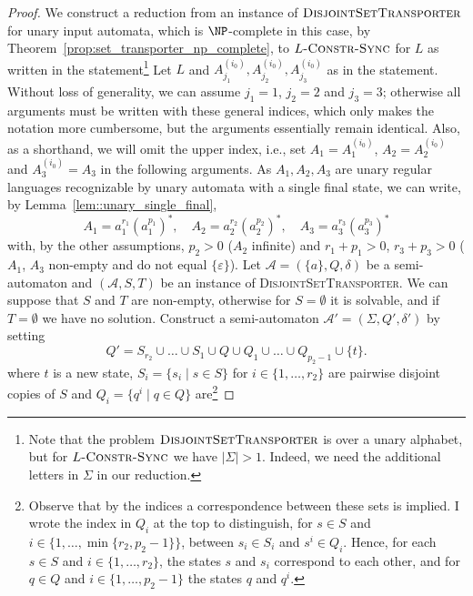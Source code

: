 \begin{proof}
 We construct a reduction from an instance
 of $\textsc{DisjointSetTransporter}$
 for unary input automata, which is $\NP$-complete in
 this case, by Theorem~\ref{prop:set_transporter_np_complete},
 to $L\textsc{-Constr-Sync}$ for $L$ as written in the statement\footnote{Note that the problem $\textsc{DisjointSetTransporter}$ is over a unary alphabet, but for $L\textsc{-Constr-Sync}$
 we have $|\Sigma| > 1$. Indeed, we need the additional letters in $\Sigma$ in our reduction.}
Let $L$ and $A_{j_1}^{(i_0)}, A_{j_2}^{(i_0)}, A_{j_3}^{(i_0)}$
as in the statement. 
Without loss of generality, we can assume $j_1 = 1$, $j_2 = 2$
and $j_3 = 3$; otherwise all arguments must be written with these general indices, which
only makes the notation more cumbersome, but the arguments essentially remain identical.
Also, as a shorthand,
we will omit the upper index, i.e.,
set $A_1 = A_1^{(i_0)}$, $A_2 = A_2^{(i_0)}$ and $A_3^{(i_0)} = A_3$
in the following arguments.
As $A_1, A_2, A_3$ are unary regular languages recognizable by 
unary automata with a single final state, we can write, by Lemma~\ref{lem::unary_single_final},
\[
    A_1 = a_1^{r_1}(a_1^{p_1})^*, \quad 
    A_2 = a_2^{r_2}(a_2^{p_2})^*, \quad
    A_3 = a_3^{r_3}(a_3^{p_3})^*
\]
with, by the other assumptions, $p_2 > 0$ ($A_2$ infinite)
and $r_1 + p_1 > 0$, $r_3 + p_3 > 0$ ($A_1$, $A_3$ non-empty and do not equal $\{\varepsilon\}$).
Let $\mathcal A = (\{a\}, Q, \delta)$ be a semi-automaton and $(\mathcal A, S, T)$
be an instance of \textsc{DisjointSetTransporter}.
We can suppose that $S$ and $T$ are non-empty, otherwise for $S = \emptyset$
it is solvable, and if $T = \emptyset$ we have no solution.
Construct a semi-automaton $\mathcal A' = (\Sigma, Q', \delta')$
by setting
\[
 Q' = S_{r_2} \cup \ldots \cup S_{1} \cup Q \cup Q_1 \cup \ldots \cup Q_{p_2-1} \cup \{ t \}. 
\]
where $t$ is a new state, $S_i = \{ s_i \mid s \in S \}$ for $i \in \{1,\ldots, r_2 \}$
are pairwise disjoint copies of $S$
and $Q_i = \{ q^i \mid q \in Q \}$ are\footnote{Observe
that by the indices a correspondence between these sets
is implied. I wrote the index
in $Q_i$ at the top to distinguish, for $s \in S$ and $i \in \{1,\ldots,\min\{r_2, p_2-1\}\}$, between
 $s_i \in S_i$ and $s^i \in Q_i$. Hence, for each $s \in S$ and $i \in \{1,\ldots, r_2\}$,
 the states $s$ and $s_i$ correspond to each other, and for $q \in Q$
 and $i \in \{1,\ldots, p_2-1\}$ the states $q$ and $q^i$.} 

\end{proof}
